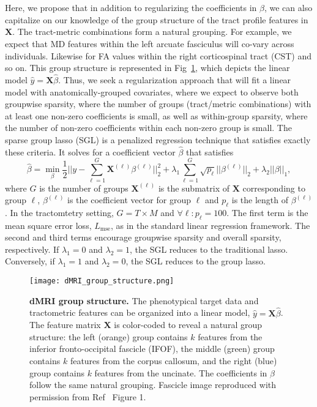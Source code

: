 Here, we propose that in addition to regularizing the coefficients
in $\hat{\beta}$, we can also capitalize on our knowledge of the
group structure of the tract profile features in $\mathbf{X}$. The
tract-metric combinations form a natural grouping. For example, we
expect that MD features within the left arcuate fasciculus will
co-vary across individuals. Likewise for FA values within the right
corticospinal tract (CST) and so on. This group structure is represented
in Fig~\ref{fig:group-structure}, which depicts the linear model
$\hat{y} = \mathbf{X} \hat{\beta}$. Thus, we seek a regularization
approach that will fit a linear model with anatomically-grouped
covariates, where we expect to observe both groupwise sparsity, where
the number of groups (tract/metric combinations) with at least one
non-zero coefficients is small, as well as within-group sparsity, where
the number of non-zero coefficients within each non-zero group is small.
The sparse group lasso (SGL) is a penalized regression technique that
satisfies exactly these criteria\cite{simon2013sparse}. It solves for a
coefficient vector
$\hat{\beta}$ that satisfies
\begin{equation}
    \hat{\beta} = \min_\beta \frac{1}{2}
    ||y - \displaystyle \sum_{\ell = 1}^{G}
    \mathbf{X}^{(\ell)} \beta^{(\ell)}||_2^2
    + \lambda_1 \displaystyle \sum_{\ell = 1}^{G}
    \sqrt{p_\ell} ||\beta^{(\ell)}||_2
    + \lambda_2 ||\beta||_1,
    \label{eq:sgl}
\end{equation}
where $G$ is the number of groups $\mathbf{X}^{(\ell)}$ is the submatrix
of $\mathbf{X}$ corresponding to group $\ell$, $\beta^{(\ell)}$ is
the coefficient vector for group $\ell$ and $p_\ell$ is the length of
$\beta^{(\ell)}$. In the tractomtetry setting, $G = T \times M$ and
$\forall \ell: p_\ell = 100$. The first term is the mean square error
loss, $L_{\text{mse}}$, as in the standard linear regression framework.
The second and third terms encourage groupwise sparsity and overall
sparsity, respectively. If $\lambda_1 = 0$ and $\lambda_2 = 1$, the
SGL reduces to the traditional lasso\cite{tibshirani1996regression}.
Conversely, if $\lambda_1 = 1$ and $\lambda_2 = 0$, the SGL reduces to
the group lasso\cite{yuan2006model}.

\begin{figure}[!h]
    \centering
    \texttt{[image: dMRI\_group\_structure.png]}
    \caption{{\bf dMRI group structure.}
        The phenotypical target data and tractometric features can
        be organized into a linear model, $\hat{y} = \mathbf{X}
        \hat{\beta}$. The feature matrix $\mathbf{X}$ is color-coded
        to reveal a natural group structure: the left (orange) group
        contains $k$ features from the inferior fronto-occipital
        fascicle (IFOF), the middle (green) group contains $k$ features
        from the corpus callosum, and the right (blue) group
        contains $k$ features from the uncinate. The coefficients in
        $\hat{\beta}$ follow the same natural grouping. Fascicle image
        reproduced with permission from Ref~\cite{yeatman2012tract}
        Figure 1.
    }
    \label{fig:group-structure}
\end{figure}



